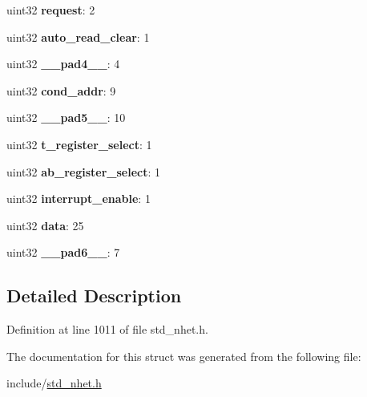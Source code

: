 \begin{DoxyCompactItemize}
\item 
\mbox{\label{structdjnz__format_ac20ac6dbdc237af173522cb09f7f497d}} 
uint32 {\bfseries request}\+: 2
\item 
\mbox{\label{structdjnz__format_adc3490ba84e4db47e6dda95b800bc552}} 
uint32 {\bfseries auto\+\_\+read\+\_\+clear}\+: 1
\item 
\mbox{\label{structdjnz__format_a8559efe4e0d8ba1e9d48a2c8251d142e}} 
uint32 {\bfseries \+\_\+\+\_\+pad4\+\_\+\+\_\+}\+: 4
\item 
\mbox{\label{structdjnz__format_a98a359b34fbfd101a196be7f8503fca5}} 
uint32 {\bfseries cond\+\_\+addr}\+: 9
\item 
\mbox{\label{structdjnz__format_a2bf030d705aad828aa126578c98bb62a}} 
uint32 {\bfseries \+\_\+\+\_\+pad5\+\_\+\+\_\+}\+: 10
\item 
\mbox{\label{structdjnz__format_a521787136ce7a56961a4edc3e45fa658}} 
uint32 {\bfseries t\+\_\+register\+\_\+select}\+: 1
\item 
\mbox{\label{structdjnz__format_a5d4a1547304a2b74e60d4dcf7f2e51a8}} 
uint32 {\bfseries ab\+\_\+register\+\_\+select}\+: 1
\item 
\mbox{\label{structdjnz__format_a8e8b3ae5b557efa0909689840ca3fc29}} 
uint32 {\bfseries interrupt\+\_\+enable}\+: 1
\item 
\mbox{\label{structdjnz__format_a24ea98c82b213f2cf9c68b6ceb756c28}} 
uint32 {\bfseries data}\+: 25
\item 
\mbox{\label{structdjnz__format_a3565d4a9ba63a928e971fdc9f83881a3}} 
uint32 {\bfseries \+\_\+\+\_\+pad6\+\_\+\+\_\+}\+: 7
\end{DoxyCompactItemize}


\subsection{Detailed Description}


Definition at line 1011 of file std\+\_\+nhet.\+h.



The documentation for this struct was generated from the following file\+:\begin{DoxyCompactItemize}
\item 
include/\mbox{\hyperlink{std__nhet_8h}{std\+\_\+nhet.\+h}}\end{DoxyCompactItemize}
